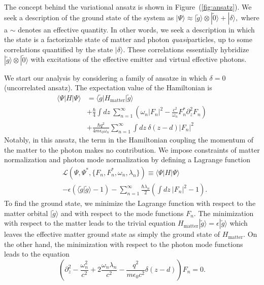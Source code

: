 \documentclass[aps,prb,twocolumn,
	groupedaddress,superscriptaddress,
	amsfonts,amssymb,amsmath,floatfix,
	citeautoscript]{revtex4-1}
\newcommand{\Jadd}[1]{\textcolor{blue}{#1}}
\begin{document}
The concept behind the variational ansatz is shown in Figure~(\ref{fig:ansatz}). We seek a description of the ground state of the system as $|\Psi\rangle \approx |\tilde{g}\rangle\otimes|\tilde{0}\rangle + |\delta\rangle,$ where a $\sim$ denotes an effective quantity. In other words, we seek a description in which the state is a factorizable state of matter and photon \textit{quasi}particles, up to some correlations quantified by the state $|\delta\rangle$. These correlations essentially hybridize $|\tilde{g}\rangle\otimes|\tilde{0}\rangle$ with excitations of the effective emitter and virtual effective photons. 

We start our analysis by considering a family of ansatze in which $\delta = 0$ (uncorrelated ansatz).  The expectation value of the Hamiltonian is %
\begin{align}\label{eq:expectation_val1}
\langle \Psi | H | \Psi \rangle &= \langle \tilde{g} |H_{\text{matter}} | \tilde{g}\rangle \nonumber \\ &+ \frac{\hbar}{4}\int dz ~\sum\limits_{n=1}^{\infty}\left(\omega_n|F_n|^2 - \frac{c^2}{\omega_n}F_n^*\partial_z^2F_n\right) \nonumber \\ &+ \frac{\hbar q^2}{4m\epsilon_0\omega_n}\sum\limits_{n=1}^{\infty} \int dz~\delta(z-d)|F_n|^2
\end{align}
Notably, in this ansatz, the term in the Hamiltonian coupling the momentum of the matter to the photon makes no contribution. We impose constraints of matter normalization and photon mode normalization by defining a Lagrange function 
\begin{align}\label{eq:lagrange}
&\mathcal{L}(\Psi, \Psi^*, \{F_n, F_n^*, \omega_n, \lambda_n\}) \equiv \langle \Psi | H | \Psi \rangle \nonumber \\ &- \epsilon(\langle \tilde{g}|\tilde{g}\rangle-1)-\sum\limits_{n=1}^{\infty}\frac{\hbar\lambda_n}{2}\left( \int dz~|F_n|^2-1\right).
\end{align} 
To find the ground state, we minimize the Lagrange function with respect to the matter orbital $|\tilde{g}\rangle$ and with respect to the mode functions $F_n$. The minimization with respect to the matter leads to the trivial equation $H_{\text{matter}} |\tilde{g}\rangle = \epsilon|\tilde{g}\rangle$ which leaves the effective matter ground state as simply the ground state of $H_{\text{matter}}$. On the other hand, the minimization with respect to the photon mode functions leads to  the equation
\begin{equation}\label{eq:maxwell}
\left(\partial_z^2-\frac{\omega^2_n}{c^2}+2\frac{\omega_n\lambda_n}{c^2}-\frac{q^2 }{m\epsilon_0 c^2}\delta(z-d)\right)F_n  = 0.
\end{equation}
\end{document}
